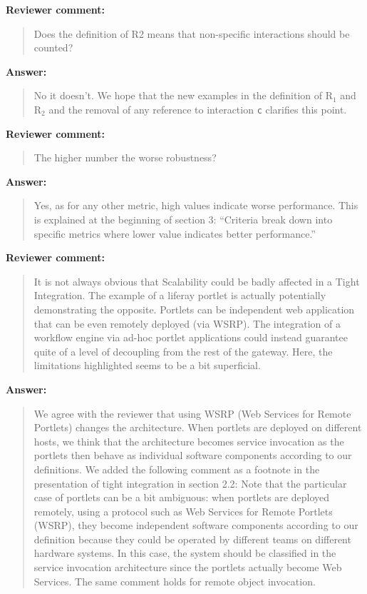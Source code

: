 \documentclass[a4]{article}
\newenvironment{review}%
{\textbf{Reviewer comment:}\begin{quote}}%
{\end{quote}}%
\newenvironment{answer}%
{\textbf{Answer:}\begin{small}\begin{quote}}%
{\end{quote}\end{small}}%
\newcommand{\revised}[1]{\color{blue} #1\color{black}\xspace}
\begin{document}
\begin{review}
Does the definition of R2 means that non-specific
  interactions should be counted?
\end{review}

\begin{answer}
No it doesn't. We hope that the new examples in the definition of
R$_1$ and R$_2$ and the removal of any reference to interaction
\texttt{c} clarifies this point.
\end{answer}

\begin{review}
The higher number the worse
  robustness?
\end{review}

\begin{answer}
Yes, as for any other metric, high values indicate worse
performance. This is explained at the beginning of section 3:
``Criteria break down into specific metrics where lower value
indicates better performance.''
\end{answer}

\begin{review}
  It is not always obvious that Scalability could be badly affected in
  a Tight Integration. The example of a liferay portlet is actually
  potentially demonstrating the opposite. Portlets can be independent
  web application that can be even remotely deployed (via WSRP). The
  integration of a workflow engine via ad-hoc portlet applications
  could instead guarantee quite of a level of decoupling from the rest
  of the gateway. Here, the limitations highlighted seems to be a bit
  superficial.
\end{review}

\begin{answer}
  We agree with the reviewer that using WSRP (Web Services for Remote
  Portlets) changes the architecture. When portlets are deployed on
  different hosts, we think that the architecture becomes service
  invocation as the portlets then behave as individual software
  components according to our definitions. We added the following comment as a footnote in the presentation of tight integration in section 2.2:
\revised{Note that the
    particular case of portlets can be a bit ambiguous: when portlets
    are deployed remotely, using a protocol such as Web Services for
    Remote Portlets (WSRP), they become independent software
    components according to our definition because they could be
    operated by different teams on different hardware systems. In this
    case, the system should be classified in the service invocation
    architecture since the portlets actually become Web
    Services. The same comment holds for remote object
    invocation.}
\end{answer}
\end{document}
